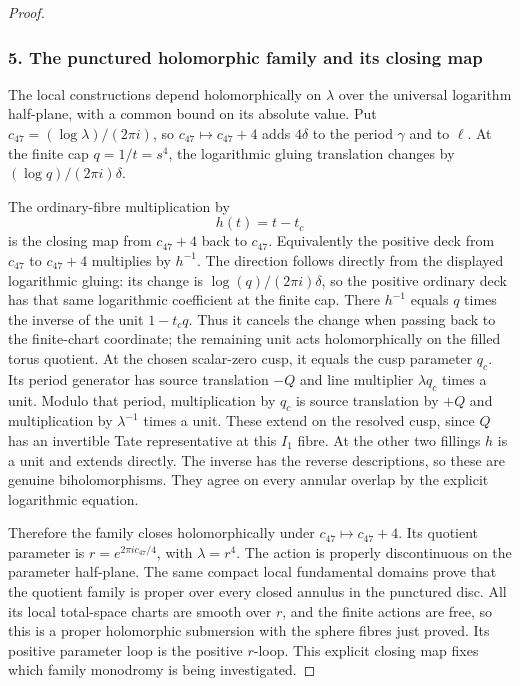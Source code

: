 \begin{proof}
\subsubsection{5. The punctured holomorphic family and its closing map}\label{the-punctured-holomorphic-family-and-its-closing-map}

The local constructions depend holomorphically on \(\lambda\) over the universal logarithm half-plane, with a common bound on its absolute value. Put \(c_{47}=(\log\lambda)/(2\pi i)\), so \(c_{47}\mapsto c_{47}+4\) adds \(4\delta\) to the period \(\gamma\) and to \(\ell\). At the finite cap \(q=1/t=s^4\), the logarithmic gluing translation changes by \((\log q)/(2\pi i)\delta\).

The ordinary-fibre multiplication by \[
 h(t)=t-t_c
\] is the closing map from \(c_{47}+4\) back to \(c_{47}\). Equivalently the positive deck from \(c_{47}\) to \(c_{47}+4\) multiplies by \(h^{-1}\). The direction follows directly from the displayed logarithmic gluing: its change is \(\log(q)/(2\pi i)\delta\), so the positive ordinary deck has that same logarithmic coefficient at the finite cap. There \(h^{-1}\) equals \(q\) times the inverse of the unit \(1-t_cq\). Thus it cancels the change when passing back to the finite-chart coordinate; the remaining unit acts holomorphically on the filled torus quotient. At the chosen scalar-zero cusp, it equals the cusp parameter \(q_c\). Its period generator has source translation \(-Q\) and line multiplier \(\lambda q_c\) times a unit. Modulo that period, multiplication by \(q_c\) is source translation by \(+Q\) and multiplication by \(\lambda^{-1}\) times a unit. These extend on the resolved cusp, since \(Q\) has an invertible Tate representative at this \(I_1\) fibre. At the other two fillings \(h\) is a unit and extends directly. The inverse has the reverse descriptions, so these are genuine biholomorphisms. They agree on every annular overlap by the explicit logarithmic equation.

Therefore the family closes holomorphically under \(c_{47}\mapsto c_{47}+4\). Its quotient parameter is \(r=e^{2\pi ic_{47}/4}\), with \(\lambda=r^4\). The action is properly discontinuous on the parameter half-plane. The same compact local fundamental domains prove that the quotient family is proper over every closed annulus in the punctured disc. All its local total-space charts are smooth over \(r\), and the finite actions are free, so this is a proper holomorphic submersion with the sphere fibres just proved. Its positive parameter loop is the positive \(r\)-loop. This explicit closing map fixes which family monodromy is being investigated.


\end{proof}
